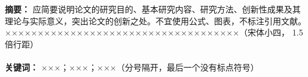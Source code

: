 \quad
\title{
}
\date{}
\maketitle
\thispagestyle{fancy}            %
\renewcommand{\headrulewidth}{1pt}      %

	\xiaosihao{}
	\noindent
	\textbf{摘要：}
	应简要说明论文的研究目的、基本研究内容、研究方法、创新性成果及其理论与实际意义，突出论文的创新之处。不宜使用公式、图表，不标注引用文献。××××××××××××××××××××××××××××××××××××（宋体小四， 1.5倍行距）
	\\
	\\
	\textbf{关键词：} ×××；×××；×××（分号隔开，最后一个没有标点符号）
